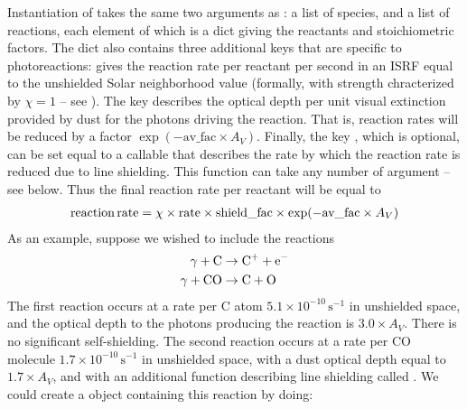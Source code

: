 \documentclass[letterpaper,10pt,english]{sphinxmanual}
\begin{document}
Instantiation of  takes the same two arguments as
{\hyperref[chemistry:ssssec-reaction-matrix]{\emph{}}}: a list of species, and a list of
reactions, each element of which is a dict giving the reactants and
stoichiometric factors. The dict also contains three additional keys
that are specific to photoreactions:  gives the reaction rate
per reactant per second in an ISRF equal to the unshielded Solar
neighborhood value (formally, with strength chracterized by
\(\chi = 1\) -- see {\hyperref[cloudfiles:tab-cloudfiles]{\emph{}}}). The key 
describes the optical depth per unit visual extinction provided by
dust for the photons driving the reaction. That is, reaction rates
will be reduced by a factor \(\exp(-\mathrm{av\_fac}\times
A_V)\). Finally, the key , which is optional, can be set
equal to a callable that describes the rate by which the reaction rate
is reduced due to line shielding. This function can take any number of
argument -- see below. Thus the final reaction rate per reactant will
be equal to
\begin{gather}
\begin{split}\mathrm{reaction\, rate} = \chi \times \mathrm{rate} \times
\mathrm{shield\_fac} \times \exp(-\mathrm{av\_fac}\times A_V)\end{split}\notag
\end{gather}
As an example, suppose we wished to include the reactions
\begin{gather}
\begin{split}\gamma + \mathrm{C} & \rightarrow \mathrm{C}^+ + \mathrm{e}^- \\
\gamma + \mathrm{CO} & \rightarrow \mathrm{C} + \mathrm{O} \\\end{split}\notag
\end{gather}
The first reaction occurs at a rate per C atom \(5.1\times
10^{-10}\,\mathrm{s}^{-1}\) in unshielded space, and the optical depth
to the photons producing the reaction is \(3.0\times A_V\). There
is no significant self-shielding. The second reaction occurs at a rate
per CO molecule \(1.7\times 10^{-10}\,\mathrm{s}^{-1}\) in
unshielded space, with a dust optical depth equal to \(1.7\times
A_V\), and with an additional function describing line shielding called
. We could create a  object containing
this reaction by doing:
\end{document}
